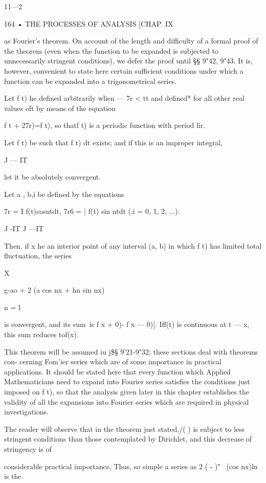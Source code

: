 11—2

164 • THE PROCESSES OF ANALYSIS [CHAP. IX

as Fourier's theorem. On account of the length and difficulty of a
formal proof of the theorem (even when the function to be expanded is
subjected to unnecessarily stringent conditions), we defer the proof
until §§ 9"42, 9"43. It is, however, convenient to state here certain
sufficient conditions under which a function can be expanded into a
trigonometrical series.

Let f t) he defined arbitrarily wlien — 7r < tt and defined* for all
other real values oft by means of the equation

f t + 27r)=f t), so thatf t) is a periodic function with period lir.

Let f t) be such that f t) dt exists; and if this is an improper
integral,

J — IT

let it be absolutely convergent.

Let a , b,i be defined by the equations

7r = I f(t)cosntdt, 7r6 = | f(t) sin ntdt (;i = 0, 1, 2, ...).

J -IT J —IT

Then, if x he an interior point of any interval (a, b) in which f t)
has limited total fluctuation, the series

X

 g-ao + 2 (a cos nx + hn sin nx)

n = l

is convergent, and its sum\ is f x + 0)- f x — 0)]. Iff(t) is
continuous at t — x, this sum reduces tof(x).

This theorem will be assumed iu j\$§ 9'21-9"32; these sections deal
with theorems con- cerning Fom'ier series which are of some importance
in practical applications. It should be stated here that every
function which Applied Mathematicians need to expand into Fourier
series satisfies the conditions just imposed on f t), so that the
analysis given later in this chapter establishes the validity of all
the expansions into Fourier series which are required in physical
investigations.

The reader will observe that in the theorem just stated,/( ) is
subject to less stringent conditions than those contemplated by
Dirichlet, and this decrease of stringency is of

considerable practical importance. Thus, so simple a series as 2 ( -
)"~ (cos nx)ln is the

